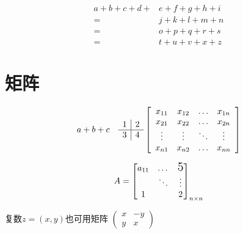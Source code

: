 \documentclass{article}
\begin{document}
	\[
	\begin{aligned} 
	a+b+c+d+& e+f+g+h+i \\
	=& j+k+l+m+n \\
	=& o+p+q+r+s \\ 
	=& t+u+v+x+z \end{aligned}
	\]
	\section{矩阵}
	\[
	a + b \\ + c\quad %
	\begin{array}{l | l}
	{1} & {2} \\ 
	\hline
	{3} & {4}
	\end{array} 
	\left[\begin{array}{cccc}
	{x_{11}} & {x_{12}} & {\dots} & {x_{1 n}} \\ 
	{x_{21}} & {x_{22}} & {\dots} & {x_{2 n}} \\ 
	{\vdots} & {\vdots} & {\ddots} & {\vdots} \\ 
	{x_{n 1}} & {x_{n 2}} & {\dots} & {x_{n n}}
	\end{array}\right]
	\]

	\[
	A = \begin{bmatrix}
		a_{11} & \dots & \text{\Large5}\\ %
		& \ddots  & \vdots \\ %
		1 &  & 2	
	\end{bmatrix}_{n \times n} %
	\]

	复数$z = (x, y)$也可用矩阵 
	\begin{math}
	\left(\begin{smallmatrix}
	x & -y \\
	y & x	
	\end{smallmatrix}\right) %
	\end{math}
\end{document}

